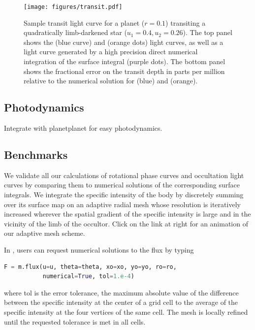 \documentclass[modern]{aastex61}
\begin{document}
%
\begin{figure}[ht!]
    \begin{centering}
    \texttt{[image: figures/transit.pdf]}
    \caption{\label{fig:transit}
             Sample transit light curve for a planet ($r = 0.1$) transiting a
             quadratically limb-darkened star ($u_1 = 0.4, u_2 = 0.26$). The
             top panel shows the \starry (blue curve) and \batman
             (orange dots) light curves, as well as a light curve generated
             by a high precision direct numerical integration of the surface
             integral (purple dots). The bottom panel shows the fractional
             error on the transit depth in parts per million relative to the
             numerical solution for \starry (blue) and \batman (orange).}
    \end{centering}
\end{figure}
%

\subsection{Photodynamics}
\label{sec:starryphotodynamics}

Integrate with \textsf{planetplanet} for easy photodynamics.


\subsection{Benchmarks}
\label{sec:starrybenchmarks}

We validate all our calculations of rotational phase curves and occultation
light curves by comparing them to numerical solutions of the corresponding
surface integrals. We integrate the specific intensity of the body by
discretely summing over its surface map on an adaptive radial mesh whose
resolution is iteratively increased wherever the spatial gradient of the
specific intensity is large and in the vicinity of the limb of the occultor.
 Click on the link at right for an animation of our
adaptive mesh scheme.

In \starry, users can request numerical solutions to the flux by typing
%
\begin{lstlisting}[language=Python,firstnumber=last]
F = m.flux(u=u, theta=theta, xo=xo, yo=yo, ro=ro,
           numerical=True, tol=1.e-4)
\end{lstlisting}
%
where \textsf{tol} is the error tolerance, the maximum absolute value of the
difference between the
specific intensity at the center of a grid cell to the average of the specific
intensity at the four vertices of the same cell. The mesh is locally
refined until the requested tolerance is met in all cells.
\end{document}
